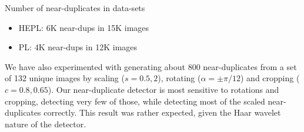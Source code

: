 

\begin{xpsectionbox}{}{}
Number of near-duplicates in data-sets %
\begin{itemize}
	\item HEPL: 6K near-dups in 15K images
	\item PL: 4K near-dups in 12K images
\end{itemize}
We have also experimented with generating about 800 near-duplicates from a set of 132 unique images by scaling ($s=0.5, 2$), rotating ($\alpha=\pm\pi/12$) and cropping ($c=0.8, 0.65$). Our near-duplicate detector is most sensitive to rotations and cropping, detecting very few of those, while detecting most of the scaled near-duplicates correctly. This result was rather expected, given the Haar wavelet nature of the detector.
\end{xpsectionbox}